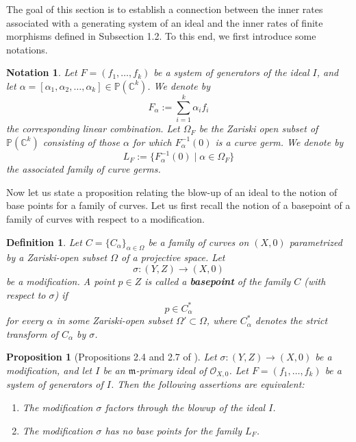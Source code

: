 \documentclass[reqno,dvipsnames,12pt]{amsart}
\newtheorem{prop}[thm]{Proposition}
\newtheorem{nota}[thm]{Notation}
\newtheorem{defi}[thm]{Definition}
\begin{document}
The goal of this section is to establish a connection between the inner rates associated with a generating system of an ideal and the inner rates of finite morphisms defined in Subsection 1.2. To this end, we first introduce some notations.

\begin{nota}
Let $F=(f_1, \dots , f_k)$ be a system of generators of the ideal $I$, and let
$\alpha=[\alpha_1,\alpha_2,\dots,\alpha_k] \in \mathbb{P}(\mathbb{C}^k)$.
We denote by
\[
F_{\alpha}:=\sum_{i=1}^k \alpha_i f_i
\]
the corresponding linear combination.
Let $\Omega_{F}$ be the Zariski open subset of $\mathbb{P}(\mathbb{C}^k)$ consisting of those $\alpha$ for which $F_{\alpha}^{-1}(0)$ is a curve germ.
We denote by
\[
L_{F}:=\{F_{\alpha}^{-1}(0) \mid \alpha \in \Omega_F\}
\]
the associated family of curve germs.
\end{nota}
Now let us state a proposition relating the blow-up of an ideal to the notion of base points for a family of curves. Let us first recall the notion of a basepoint of a family of curves with respect to a modification.

\begin{defi}\label{pointbasedefi1996}
Let $C=\{C_\alpha\}_{\alpha \in \Omega}$ be a family of curves on $(X,0)$ parametrized by a Zariski-open subset $\Omega$ of a projective space. Let 
\[
\sigma:(Y,Z)\longrightarrow (X,0)
\]
be a modification. A point $p\in Z$ is called a \textbf{basepoint} of the family $C$ (with respect to $\sigma$) if
\[
p\in C_\alpha^*
\]
for every $\alpha$ in some Zariski-open subset $\Omega'\subset \Omega$, where $C_\alpha^*$ denotes the strict transform of $C_\alpha$ by $\sigma$.
\end{defi}
\begin{prop}[Propositions 2.4 and 2.7 of \cite{yenni2}]\label{hironakablowupideal}
Let $\sigma:(Y,Z)\longrightarrow (X,0)$ be a modification, and let $I$ be an $\mathfrak{m}$-primary ideal of $\mathcal{O}_{X,0}$. Let $F=(f_1,\dots,f_k)$ be a system of generators of $I$. Then the following assertions are equivalent:
\begin{enumerate}
\item The modification $\sigma$ factors through the blowup of the ideal $I$.
\item The modification $\sigma$ has no base points for the family $L_{F}$.
\end{enumerate}
\end{prop}
\end{document}
